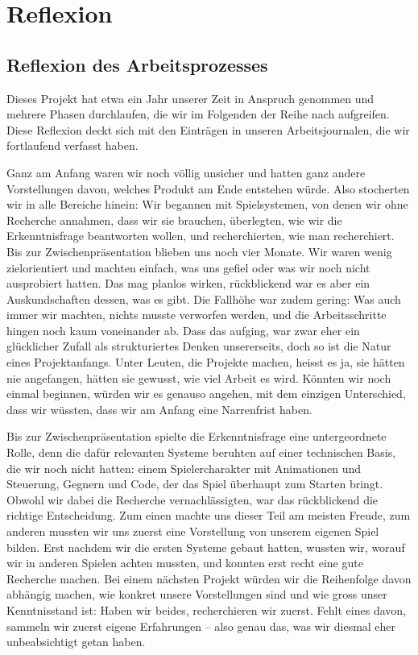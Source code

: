 \documentclass[../Main.tex]{subfiles}
\begin{document}
\section{Reflexion} \label{sec:Reflexion}

\subsection{Reflexion des Arbeitsprozesses}

Dieses Projekt hat etwa ein Jahr unserer Zeit in Anspruch genommen und mehrere Phasen durchlaufen, die wir im Folgenden der Reihe nach aufgreifen. Diese Reflexion deckt sich mit den Einträgen in unseren Arbeitsjournalen, die wir fortlaufend verfasst haben.

Ganz am Anfang waren wir noch völlig unsicher und hatten ganz andere Vorstellungen davon, welches Produkt am Ende entstehen würde. Also stocherten wir in alle Bereiche hinein: Wir begannen mit Spielsystemen, von denen wir ohne Recherche annahmen, dass wir sie brauchen, überlegten, wie wir die Erkenntnisfrage beantworten wollen, und recherchierten, wie man recherchiert. Bis zur Zwischenpräsentation blieben uns noch vier Monate. Wir waren wenig zielorientiert und machten einfach, was uns gefiel oder was wir noch nicht ausprobiert hatten. Das mag planlos wirken, rückblickend war es aber ein Auskundschaften dessen, was es gibt. Die Fallhöhe war zudem gering: Was auch immer wir machten, nichts musste verworfen werden, und die Arbeitsschritte hingen noch kaum voneinander ab. Dass das aufging, war zwar eher ein glücklicher Zufall als strukturiertes Denken unsererseits, doch so ist die Natur eines Projektanfangs. Unter Leuten, die Projekte machen, heisst es ja, sie hätten nie angefangen, hätten sie gewusst, wie viel Arbeit es wird. Könnten wir noch einmal beginnen, würden wir es genauso angehen, mit dem einzigen Unterschied, dass wir wüssten, dass wir am Anfang eine Narrenfrist haben.

Bis zur Zwischenpräsentation spielte die Erkenntnisfrage eine untergeordnete Rolle, denn die dafür relevanten Systeme beruhten auf einer technischen Basis, die wir noch nicht hatten: einem Spielercharakter mit Animationen und Steuerung, Gegnern und Code, der das Spiel überhaupt zum Starten bringt. Obwohl wir dabei die Recherche vernachlässigten, war das rückblickend die richtige Entscheidung. Zum einen machte uns dieser Teil am meisten Freude, zum anderen mussten wir uns zuerst eine Vorstellung von unserem eigenen Spiel bilden. Erst nachdem wir die ersten Systeme gebaut hatten, wussten wir, worauf wir in anderen Spielen achten mussten, und konnten erst recht eine gute Recherche machen. Bei einem nächsten Projekt würden wir die Reihenfolge davon abhängig machen, wie konkret unsere Vorstellungen sind und wie gross unser Kenntnisstand ist: Haben wir beides, recherchieren wir zuerst. Fehlt eines davon, sammeln wir zuerst eigene Erfahrungen -- also genau das, was wir diesmal eher unbeabsichtigt getan haben.
\end{document}
